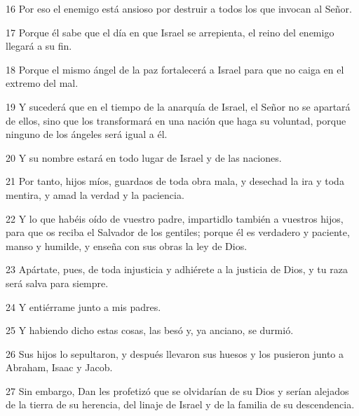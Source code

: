 \par 16 Por eso el enemigo está ansioso por destruir a todos los que invocan al Señor.

\par 17 Porque él sabe que el día en que Israel se arrepienta, el reino del enemigo llegará a su fin.

\par 18 Porque el mismo ángel de la paz fortalecerá a Israel para que no caiga en el extremo del mal.

\par 19 Y sucederá que en el tiempo de la anarquía de Israel, el Señor no se apartará de ellos, sino que los transformará en una nación que haga su voluntad, porque ninguno de los ángeles será igual a él.

\par 20 Y su nombre estará en todo lugar de Israel y de las naciones.

\par 21 Por tanto, hijos míos, guardaos de toda obra mala, y desechad la ira y toda mentira, y amad la verdad y la paciencia.

\par 22 Y lo que habéis oído de vuestro padre, impartidlo también a vuestros hijos, para que os reciba el Salvador de los gentiles; porque él es verdadero y paciente, manso y humilde, y enseña con sus obras la ley de Dios.

\par 23 Apártate, pues, de toda injusticia y adhiérete a la justicia de Dios, y tu raza será salva para siempre.

\par 24 Y entiérrame junto a mis padres.

\par 25 Y habiendo dicho estas cosas, las besó y, ya anciano, se durmió.

\par 26 Sus hijos lo sepultaron, y después llevaron sus huesos y los pusieron junto a Abraham, Isaac y Jacob.

\par 27 Sin embargo, Dan les profetizó que se olvidarían de su Dios y serían alejados de la tierra de su herencia, del linaje de Israel y de la familia de su descendencia.



